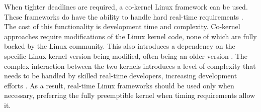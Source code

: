                 When tighter deadlines are required, a co-kernel Linux framework
                    can be used.
                These frameworks do have the ability to handle hard real-time
                    requirements \cite{preempt-rt-survey}.
                The cost of this functionality is development time and
                    complexity.
                Co-kernel approaches require modifications of the Linux kernel
                    code, none of which are fully backed by the
                    Linux community.
                This also introduces a dependency on the specific Linux kernel
                    version being modified, often being an older version
                    \cite{preempt-rt-survey}.
                The complex interaction between the two kernels introduces a
                    level of complexity that needs to be handled by skilled
                    real-time developers, increasing development efforts
                    \cite{preempt-rt-survey}.
                As a result, real-time Linux frameworks should be used only when
                    necessary, preferring the fully preemptible kernel when
                    timing requirements allow it.
